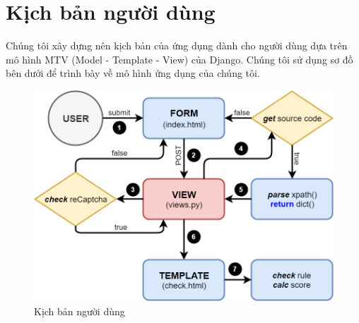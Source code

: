 \section{Kịch bản người dùng}
Chúng tôi xây dựng nên kịch bản của ứng dụng dành cho người dùng dựa trên mô hình MTV (Model - Template - View) của Django. Chúng tôi sử dụng sơ đồ bên dưới để trình bày về mô hình ứng dụng của chúng tôi.
\begin{center}
	\begin{figure}[!ht]
		\centering
		\includegraphics[width=120mm]{images/kich-ban-nguoi-dung.png}
		\caption{Kịch bản người dùng}
	\end{figure}
\end{center}
